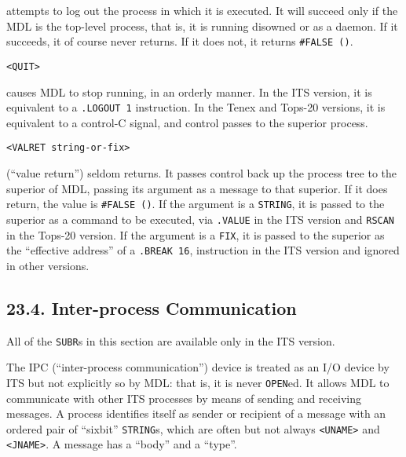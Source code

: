 \documentclass[a4paper,]{article}
\begin{document}
 attempts to log out the process in which it is executed. It will succeed only if the MDL is
the top-level process, that is, it is running disowned or as a daemon. If it succeeds, it of course never returns. If it
does not, it returns \texttt{\#FALSE\ ()}.

\begin{verbatim}
<QUIT>
\end{verbatim}

 causes MDL to stop running, in an orderly manner. In the ITS version, it is equivalent to a
\texttt{.LOGOUT\ 1} instruction. In the Tenex and Tops-20 versions, it is equivalent to a control-C signal, and control
passes to the superior process.

\begin{verbatim}
<VALRET string-or-fix>
\end{verbatim}

 (``value return'') seldom returns. It passes control back up the process tree to the
superior of MDL, passing its argument as a message to that superior. If it does return, the value is \texttt{\#FALSE\ ()}.
If the argument is a \texttt{STRING}, it is passed to the superior as a command to be executed, via \texttt{.VALUE} in the
ITS version and \texttt{RSCAN} in the Tops-20 version. If the argument is a \texttt{FIX}, it is passed to the superior as
the ``effective address'' of a \texttt{.BREAK\ 16}, instruction in the ITS version and ignored in other versions.

\subsection{23.4. Inter-process Communication}\label{inter-process-communication}

All of the \texttt{SUBR}s in this section are available only in the ITS version.

The IPC (``inter-process communication'') device is treated as an I/O device by ITS but not explicitly so by MDL: that is,
it is never \texttt{OPEN}ed. It allows MDL to communicate with other ITS processes by means of sending and receiving
messages. A process identifies itself as sender or recipient of a message with an ordered pair of ``sixbit''
\texttt{STRING}s, which are often but not always \texttt{\textless{}UNAME\textgreater{}} and
\texttt{\textless{}JNAME\textgreater{}}. A message has a ``body'' and a ``type''.
\end{document}
